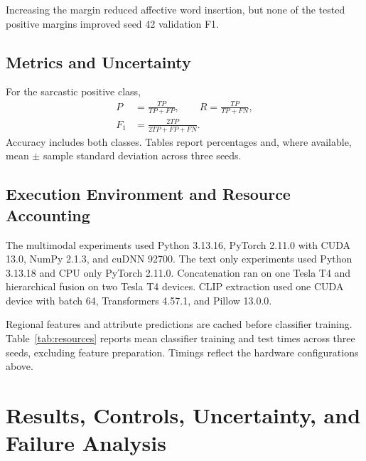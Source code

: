 \documentclass[conference]{IEEEtran}
\begin{document}
Increasing the margin reduced affective word insertion, but none of the tested positive margins improved seed 42 validation F1.

\begin{table}[!ht]
\caption{Margin screening on seed 42 validation data only. Insertion rates refer to validation images.}
\label{tab:clip-thresholds}
\centering\footnotesize

\end{table}

\subsection{Metrics and Uncertainty}
For the sarcastic positive class,
\begin{align}
P&=\frac{TP}{TP+FP},\qquad R=\frac{TP}{TP+FN},\\
F_1&=\frac{2TP}{2TP+FP+FN}.
\end{align}
Accuracy includes both classes. Tables report percentages and, where available, mean $\pm$ sample standard deviation across three seeds.

\subsection{Execution Environment and Resource Accounting}
The multimodal experiments used Python 3.13.16, PyTorch 2.11.0 with CUDA 13.0, NumPy 2.1.3, and cuDNN 92700. The text only experiments used Python 3.13.18 and CPU only PyTorch 2.11.0. Concatenation ran on one Tesla T4 and hierarchical fusion on two Tesla T4 devices. CLIP extraction used one CUDA device with batch 64, Transformers 4.57.1, and Pillow 13.0.0.

Regional features and attribute predictions are cached before classifier training. Table~\ref{tab:resources} reports mean classifier training and test times across three seeds, excluding feature preparation. Timings reflect the hardware configurations above.

\begin{table}[t]
\caption{Mean classifier training and test times across three seeds, excluding feature preparation.}
\label{tab:resources}
\centering\small

\end{table}

\section{Results, Controls, Uncertainty, and Failure Analysis}
\end{document}
